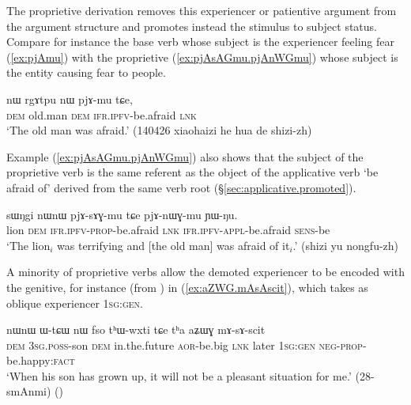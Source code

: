 The proprietive derivation removes this experiencer or patientive argument from the argument structure and promotes instead the stimulus to subject status. Compare for instance the base verb  whose subject is the experiencer feeling fear (\ref{ex:pjAmu}) with the proprietive  (\ref{ex:pjAsAGmu.pjAnWGmu}) whose subject is the entity causing fear to people. 


\begin{exe}
\ex \label{ex:pjAmu}
\gll nɯ rgɤtpu nɯ pjɤ-mu tɕe, \\
\textsc{dem} old.man \textsc{dem} \textsc{ifr}.\textsc{ipfv}-be.afraid \textsc{lnk} \\
\glt `The old man was afraid.' (140426 xiaohaizi he hua de shizi-zh)
\end{exe}


Example (\ref{ex:pjAsAGmu.pjAnWGmu}) also shows that the subject of the proprietive verb  is the same referent as the object of the applicative verb  `be afraid of' derived from the same verb root (§\ref{sec:applicative.promoted}).

\begin{exe}
\ex \label{ex:pjAsAGmu.pjAnWGmu}
\gll sɯŋgi nɯnɯ pjɤ-sɤɣ-mu tɕe pjɤ-nɯɣ-mu ɲɯ-ŋu.\\
lion \textsc{dem} \textsc{ifr}.\textsc{ipfv}-\textsc{prop}-be.afraid \textsc{lnk} \textsc{ifr}.\textsc{ipfv}-\textsc{appl}-be.afraid \textsc{sens}-be \\
\glt `The lion$_i$ was terrifying and [the old man] was afraid of it$_i$.' (shizi yu nongfu-zh)
\end{exe}


A minority of proprietive verbs allow the demoted experiencer to be encoded with the genitive, for instance  (from ) in (\ref{ex:aZWG.mAsAscit}), which takes as oblique experiencer  \textsc{1sg}:\textsc{gen}.

\begin{exe}
\ex \label{ex:aZWG.mAsAscit}
\gll  nɯnɯ ɯ-tɕɯ nɯ fso tʰɯ-wxti tɕe tʰa aʑɯɣ mɤ-sɤ-scit \\
\textsc{dem} \textsc{3sg}.\textsc{poss}-son \textsc{dem} in.the.future \textsc{aor}-be.big \textsc{lnk} later \textsc{1sg}:\textsc{gen} \textsc{neg}-\textsc{prop}-be.happy:\textsc{fact} \\
\glt `When his son has grown up, it will not be a pleasant situation for me.' (28-smAnmi)
()
\end{exe}
 

